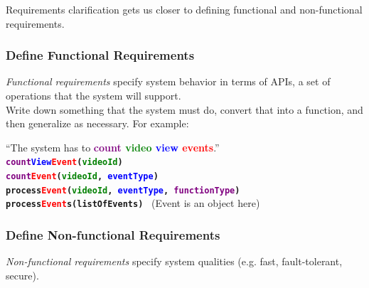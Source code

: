 \documentclass[12pt, titlepage]{article}
\newcommand{\textbt}[1]{\textbf{\texttt{#1}}}
\begin{document}
Requirements clarification gets us closer to defining functional and non-functional requirements.

\subsubsection{Define Functional Requirements}

\textit{Functional requirements} specify system behavior in terms of APIs, a set of operations that the system will support. \\

Write down something that the system must do, convert that into a function, and then generalize as necessary. For example: \\

\begin{adjustwidth}{2em}{0em}

``The system has to \textbf{\textcolor{purple}{count} \textcolor{green}{video} \textcolor{blue}{view} \textcolor{red}{events}}.'' \\

\textbt{\textcolor{purple}{count}\textcolor{blue}{View}\textcolor{red}{Event}(\textcolor{green}{videoId})} \\

\textbt{\textcolor{purple}{count}\textcolor{red}{Event}(\textcolor{green}{videoId}, \textcolor{blue}{eventType})} \\

\textbt{process\textcolor{red}{Event}(\textcolor{green}{videoId}, \textcolor{blue}{eventType}, \textcolor{purple}{functionType})} \\

  \textbt{process\textcolor{red}{Event}s(listOfEvents)} \ (Event is an object here)

\end{adjustwidth}

\subsubsection{Define Non-functional Requirements}

\textit{Non-functional requirements} specify system qualities (e.g. fast, fault-tolerant, secure). \\
\end{document}
